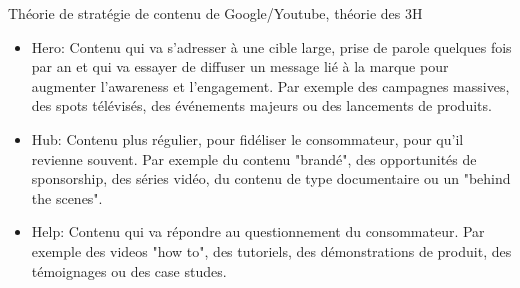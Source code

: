 Théorie de stratégie de contenu de Google/Youtube, théorie des 3H

\begin{itemize}
    \item Hero: Contenu qui va s'adresser à une cible large, prise de parole quelques fois par an et qui va essayer de diffuser un message lié à la marque pour augmenter l'awareness et l'engagement. Par exemple des campagnes massives, des spots télévisés, des événements majeurs ou des lancements de produits.
    \item Hub: Contenu plus régulier, pour fidéliser le consommateur, pour qu'il revienne souvent. Par exemple du contenu "brandé", des opportunités de sponsorship, des séries vidéo, du contenu de type documentaire ou un "behind the scenes".
    \item Help: Contenu qui va répondre au questionnement du consommateur. Par exemple des videos "how to", des tutoriels, des démonstrations de produit, des témoignages ou des case studes.\\
\end{itemize}
